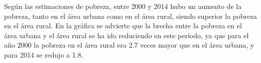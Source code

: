 Según las estimaciones de pobreza, entre 2000 y 2014 hubo un aumento de la pobreza, tanto en el área urbana como en el área rural, siendo superior la pobreza en el área rural.  En la gráfica se advierte que la brecha entre la pobreza en el área urbana y el área rural se ha ido reduciendo en este período, ya que para el año 2000 la pobreza en el área rural era 2.7 veces mayor que en el área urbana, y para 2014 se redujo a 1.8. 